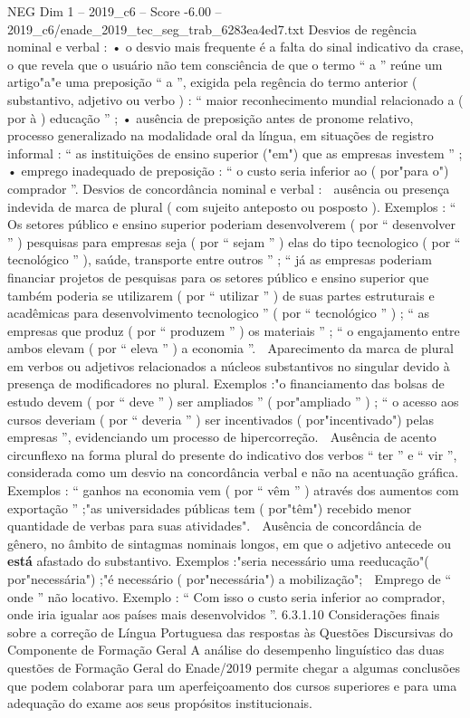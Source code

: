 \begin{textsample}{NEG Dim 1 – 2019\_c6 – Score -6.00 – 2019\_c6/enade\_2019\_tec\_seg\_trab\_6283ea4ed7.txt}
Desvios de regência nominal e verbal : • o desvio mais frequente é a falta do sinal indicativo da crase, o que revela que o usuário não tem consciência de que o termo “ a ” reúne um artigo"a"e uma preposição “ a ”, exigida pela regência do termo anterior ( substantivo, adjetivo ou verbo ) : “ maior reconhecimento mundial relacionado a ( por à ) educação ” ; • ausência de preposição antes de pronome relativo, processo generalizado na modalidade oral da língua, em situações de registro informal : “ as instituições de ensino superior ("em") que as empresas investem ” ; • emprego inadequado de preposição : “ o custo seria inferior ao ( por"para o") comprador ”.
Desvios de concordância nominal e verbal :  ausência ou presença indevida de marca de plural ( com sujeito anteposto ou posposto ).
Exemplos : “ Os setores público e ensino superior poderiam desenvolverem ( por “ desenvolver ” ) pesquisas para empresas seja ( por “ sejam ” ) elas do tipo tecnologico ( por “ tecnológico ” ), saúde, transporte entre outros ” ; “ já as empresas poderiam financiar projetos de pesquisas para os setores público e ensino superior que também poderia se utilizarem ( por “ utilizar ” ) de suas partes estruturais e acadêmicas para desenvolvimento tecnologico ” ( por “ tecnológico ” ) ; “ as empresas que produz ( por “ produzem ” ) os materiais ” ; “ o engajamento entre ambos elevam ( por “ eleva ” ) a economia ”.  Aparecimento da marca de plural em verbos ou adjetivos relacionados a núcleos substantivos no singular devido à presença de modificadores no plural.
Exemplos :"o financiamento das bolsas de estudo devem ( por “ deve ” ) ser ampliados ” ( por"ampliado ” ) ; “ o acesso aos cursos deveriam ( por “ deveria ” ) ser incentivados ( por"incentivado") pelas empresas ”, evidenciando um processo de hipercorreção.  Ausência de acento circunflexo na forma plural do presente do indicativo dos verbos “ ter ” e “ vir ”, considerada como um desvio na concordância verbal e não na acentuação gráfica.
Exemplos : “ ganhos na economia vem ( por “ vêm ” ) através dos aumentos com exportação ” ;"as universidades públicas tem ( por"têm") recebido menor quantidade de verbas para suas atividades".  Ausência de concordância de gênero, no âmbito de sintagmas nominais longos, em que o adjetivo antecede ou \textbf{está} afastado do substantivo.
Exemplos :"seria necessário uma reeducação"( por"necessária") ;"é necessário ( por"necessária") a mobilização";  Emprego de “ onde ” não locativo.
Exemplo : “ Com isso o custo seria inferior ao comprador, onde iria igualar aos países mais desenvolvidos ”. 6.3.1.10 Considerações finais sobre a correção de Língua Portuguesa das respostas às Questões Discursivas do Componente de Formação Geral A análise do desempenho linguístico das duas questões de Formação Geral do Enade/2019 permite chegar a algumas conclusões que podem colaborar para um aperfeiçoamento dos cursos superiores e para uma adequação do exame aos seus propósitos institucionais.

\end{textsample}
